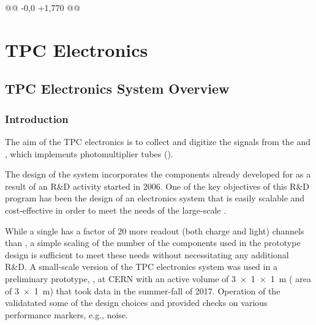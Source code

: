 @@ -0,0 +1,770 @@
\chapter{TPC Electronics}
\label{ch:fddp-tpc-elec}


\section{TPC Electronics System Overview}
\label{sec:fddp-tpc-elec-ov}

\subsection{Introduction}
\label{sec:fddp-tpc-elec-intro}

The aim of the  TPC electronics is to collect and digitize the signals from the %
 and , which implements %
photomultiplier tubes (). %


The design of the system incorporates the components already developed for  as a result of an R\&D activity started in 2006. One of the key objectives of this R\&D program has been the design of an electronics system that is easily scalable and cost-effective in order to meet the needs of the large-scale . %


While a single  has a factor of \num{20} more readout (both charge and light) channels than , a simple scaling of the number of the components used in the prototype design is sufficient to meet these needs without necessitating any additional R\&D. A small-scale version of the TPC electronics system was used in a preliminary \dual \lartpc prototype, ,  at CERN with an active volume  of \SI[product-units=power]{3x1x1}{m} ( area of \SI[product-units=power]{3x1}{m}) that took data in the summer-fall of 2017. %
Operation of the  validatated some of the design choices and provided checks on various performance markers, e.g., noise. 


